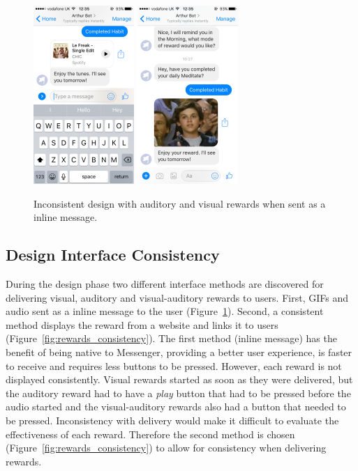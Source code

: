 \begin{figure}[H]
  \centering
  \includegraphics[width=1.5in]{../resources/design/reward-audio-inline.png}
  \hspace{10px}
  \includegraphics[width=1.5in]{../resources/design/reward-visual-inline.png}
  \caption{Inconsistent design with auditory and visual rewards when sent as a inline message.}
  \label{fig:rewards_inline}
\end{figure}

\subsection*{Design Interface Consistency}
During the design phase two different interface methods are discovered for delivering visual, auditory and visual-auditory rewards to users. First, GIFs and audio sent as a inline message to the user (Figure~\ref{fig:rewards_inline}). Second, a consistent method displays the reward from a website and links it to users (Figure~\ref{fig:rewards_consistency}). The first method (inline message) has the benefit of being native to Messenger, providing a better user experience, is faster to receive and requires less buttons to be pressed. However, each reward is not displayed consistently. Visual rewards started as soon as they were delivered, but the auditory reward had to have a \textit{play} button that had to be pressed before the audio started and the visual-auditory rewards also had a button that needed to be pressed. Inconsistency with delivery would make it difficult to evaluate the effectiveness of each reward. Therefore the second method is chosen (Figure~\ref{fig:rewards_consistency}) to allow for consistency when delivering rewards.


